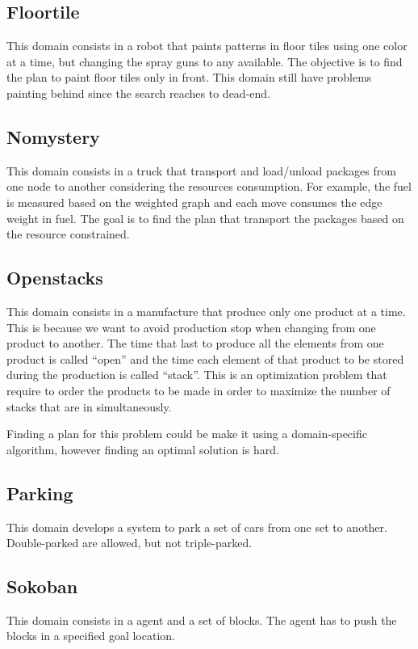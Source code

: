 \subsection{Floortile}
This domain consists in a robot that paints patterns in floor tiles using one color at a time, but changing the spray guns to any available. The objective is to find the plan to paint floor tiles only in front. This domain still have problems painting behind since the search reaches to dead-end.

\subsection{Nomystery}
This domain consists in a truck that transport and load/unload packages from one node to another considering the resources consumption. For example, the fuel is measured based on the weighted graph and each move consumes the edge weight in fuel. The goal is to find the plan that transport the packages based on the resource constrained.

\subsection{Openstacks}
This domain consists in a manufacture that produce only one product at a time. This is because we want to avoid production stop when changing from one product to another. The time that last to produce all the elements from one product is called ``open'' and the time each element of that product to be stored during the production is called ``stack''. This is an optimization problem that require to order the products to be made in order to maximize the number of stacks that are in simultaneously.

Finding a plan for this problem could be make it using a domain-specific algorithm, however finding an optimal solution is hard.

\subsection{Parking}
This domain develops a system to park a set of cars from one set to another. Double-parked are allowed, but not triple-parked.

\subsection{Sokoban}
This domain consists in a agent and a set of blocks. The agent has to push the blocks in a specified goal location. 

